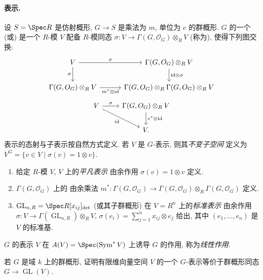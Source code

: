 \paragraph{表示.}
\begin{definition}[表示]\label{src:B.1.13}
设 $S=\Spec R$ 是仿射概形, $G\to S$ 是乘法为 $m$, 单位为 $e$ 的群概形. $G$ 的一个 (或) 是一个 $R$-模 $V$ 配备 $R$-模同态 $\sigma:V\to\Gamma(G,\mathcal O_G)\otimes_R V$ (称为), 使得下列图交换:
\[
\begin{tikzcd}[column sep=3em]
V\arrow[r,"\sigma"]\arrow[d,"\sigma"']&\Gamma(G,\mathcal O_G)\otimes_R V\arrow[d,"\mathrm{id}\otimes\sigma"]\\
\Gamma(G,\mathcal O_G)\otimes_R V\arrow[r,"m^*\otimes\mathrm{id}"']&\Gamma(G,\mathcal O_G)\otimes_R\Gamma(G,\mathcal O_G)\otimes_R V
\end{tikzcd}
\]
\[
\begin{tikzcd}
V\arrow[r,"\sigma"]\arrow[dr,"\mathrm{id}"']&\Gamma(G,\mathcal O_G)\otimes_R V\arrow[d,"e^*\otimes\mathrm{id}"]\\
&V.
\end{tikzcd}
\]
表示的态射与子表示按自然方式定义. 若 $V$ 是 $G$-表示, 则其\textit{不变子空间} 定义为 $V^G=\{v\in V\mid\sigma(v)=1\otimes v\}$.
\end{definition}
\begin{example}\label{src:B.1.14}
\begin{enumerate}[(1)]
\item 给定 $R$-模 $V$, $V$ 上的\textit{平凡表示} 由余作用 $\sigma(v)=1\otimes v$ 定义.
\item $\Gamma(G,\mathcal O_G)$ 上的 由余乘法 $m^*:\Gamma(G,\mathcal O_G)\to\Gamma(G,\mathcal O_G)\otimes_R\Gamma(G,\mathcal O_G)$ 定义.
\item $\operatorname{GL}_{n,R}=\Spec R[x_{ij}]_{\det}$ (或其子群概形) 在 $V=R^n$ 上的\textit{标准表示} 由余作用 $\sigma:V\to\Gamma(\operatorname{GL}_{n,R})\otimes_R V$, $\sigma(e_i)=\sum_{j=1}^n x_{ij}\otimes e_j$ 给出, 其中 $(e_1,\ldots,e_n)$ 是 $V$ 的标准基.
\end{enumerate}
\end{example}
$G$ 的表示 $V$ 在 $\mathbb A(V)=\Spec(\operatorname{Sym}^*V)$ 上诱导 $G$ 的作用, 称为\textit{线性作用}.
\begin{exercise}\label{src:B.1.15}
若 $G$ 是域 $k$ 上的群概形, 证明有限维向量空间 $V$ 的一个 $G$-表示等价于群概形同态 $G\to\operatorname{GL}(V)$.
\end{exercise}
